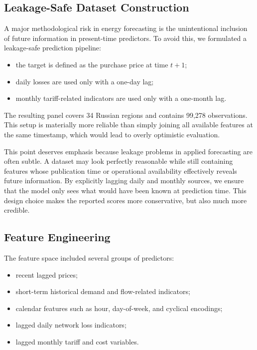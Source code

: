 \documentclass[10pt,conference,onecolumn]{IEEEtran}
\begin{document}
\subsection{Leakage-Safe Dataset Construction}

A major methodological risk in energy forecasting is the unintentional inclusion of future information in present-time predictors. To avoid this, we formulated a leakage-safe prediction pipeline:
\begin{itemize}
    \item the target is defined as the purchase price at time $t+1$;
    \item daily losses are used only with a one-day lag;
    \item monthly tariff-related indicators are used only with a one-month lag.
\end{itemize}

The resulting panel covers 34 Russian regions and contains 99{,}278 observations. This setup is materially more reliable than simply joining all available features at the same timestamp, which would lead to overly optimistic evaluation.

This point deserves emphasis because leakage problems in applied forecasting are often subtle. A dataset may look perfectly reasonable while still containing features whose publication time or operational availability effectively reveals future information. By explicitly lagging daily and monthly sources, we ensure that the model only sees what would have been known at prediction time. This design choice makes the reported scores more conservative, but also much more credible.

\subsection{Feature Engineering}

The feature space included several groups of predictors:
\begin{itemize}
    \item recent lagged prices;
    \item short-term historical demand and flow-related indicators;
    \item calendar features such as hour, day-of-week, and cyclical encodings;
    \item lagged daily network loss indicators;
    \item lagged monthly tariff and cost variables.
\end{itemize}
\end{document}
